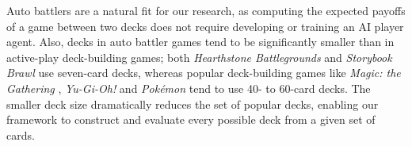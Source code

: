Auto battlers are a natural fit for our research, as computing the
expected payoffs of a game between two decks does not require
developing or training an AI player agent. Also, decks in auto battler
games tend to be significantly smaller than in active-play
deck-building games; both \textit{Hearthstone Battlegrounds}
\cite{hearthstone-battlegrounds} and \textit{Storybook Brawl}
\cite{storybook-brawl} use seven-card decks, whereas popular
deck-building games like \textit{Magic: the Gathering}
\cite{magic-the-gathering}, \textit{Yu-Gi-Oh!} \cite{yugioh-tcg} and
\textit{Pok\'{e}mon} \cite{pokemon-tcg} tend to use 40- to 60-card
decks.
The smaller deck size dramatically reduces the set of popular decks,
enabling our framework to construct and evaluate every possible deck
from a given set of cards.



